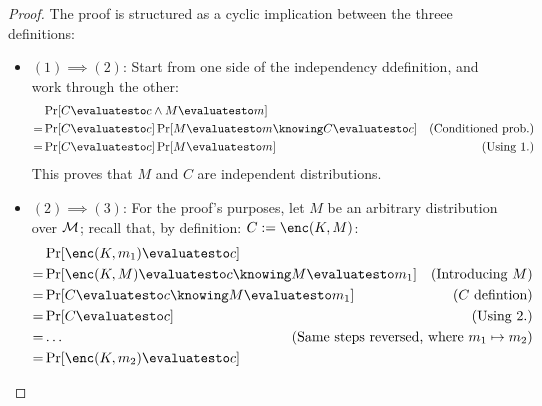 \begin{proof}
    The proof is structured as a cyclic implication between the threee definitions:
    
    \begin{itemize}
        \item $(1) \implies (2)$: Start from one side of the independency ddefinition, and work through the other:
        \begin{align*}
            & \Pr[C \evaluatesto c \wedge M \evaluatesto m] \\
            =& \Pr[C \evaluatesto c] \Pr[M \evaluatesto m \knowing C \evaluatesto c] & \text{(Conditioned prob.)} \\
            =& \Pr[C \evaluatesto c] \Pr[M \evaluatesto m] & \text{(Using 1.)} \\
        \end{align*}
        This proves that $M$ and $C$ are independent distributions.
        
        \item $(2) \implies (3)$: For the proof's purposes, let $M$ be an arbitrary distribution over $\mathcal{M}$; recall that, by definition: $C := \enc(K, M)$:
        \begin{align*}
            & \Pr[\enc(K, m_1) \evaluatesto c] & \\
            =& \Pr[\enc(K, M) \evaluatesto c \knowing M \evaluatesto m_1] & \text{(Introducing $M$)} \\
            =& \Pr[C \evaluatesto c \knowing M \evaluatesto m_1] & \text{($C$ defintion)} \\
            =& \Pr[C \evaluatesto c] & \text{(Using 2.)} \\
            =& \dots & \mathllap{\text{(Same steps reversed, where $m_1 \mapsto m_2$)}} \\
            =& \Pr[\enc(K, m_2) \evaluatesto c] & 
        \end{align*}



\end{itemize}
\end{proof}
